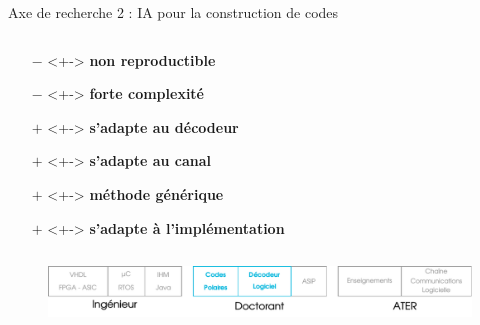\documentclass[t,compress,mathserif,12pt,xcolor=dvipsnames]{beamer}
\newcommand{\RED} [1]{\textcolor{Paired-5}{\textbf{#1}}}
\newcommand{\GREEN} [1]{\textcolor{Paired-3}{\textbf{#1}}}
\begin{document}
\begin{frame}[t]{Axe de recherche 2 : IA pour la construction de codes}
\begin{minipage}[t][5.0cm][t]{\textwidth}
\begin{columns}[T]
\begin{column}{0.45\textwidth}
\begin{center}
        \end{center}
        \vspace*{-1cm}
        \small{
        \begin{itemize}
          \setlength\itemsep{-0.5em}
          \item[\RED{$-$}]  <+-> \RED  {non reproductible}
          \item[\RED{$-$}]  <+-> \RED  {forte complexité}
          \item[\GREEN{$+$}]<+-> \GREEN{s'adapte au décodeur}
          \item[\GREEN{$+$}]<+-> \GREEN{s'adapte au canal}
          \item[\GREEN{$+$}]<+-> \GREEN{méthode générique}
          \item[\GREEN{$+$}]<+-> \GREEN{s'adapte à l'implémentation}
        \end{itemize}
        }
      \end{column}
    \end{columns}
        {
          \vspace*{-2.5cm}
          \renewcommand{\section}[2]{} %
          \renewcommand*{\bibfont}{\scriptsize}
          \nocite{ai_coding}
          \printbibliography[keyword={ai_coding}]
        }
  \end{minipage}
  \begin{figure}[htp]
    \centering
    \includegraphics[width=\textwidth]{fig/frise24}
  \end{figure}
\end{frame}
\end{document}
